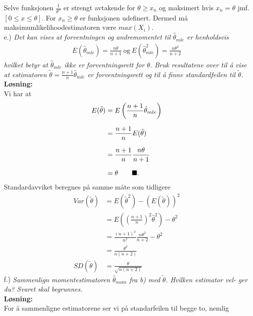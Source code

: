 \documentclass[12pt,
               a4paper,
               article,
               oneside,
               oldfontcommands,
               norsk]{memoir}
\newcommand{\Q}{ \qquad \hfill \blacksquare}
\begin{document}
Selve funksjonen $\frac{1}{\theta^n}$ er strengt avtakende for $\theta \geq x_n$ og maksimert hvis $x_n = \theta$ jmf. $[0 \leq x \leq \theta]$. For $x_n \geq \theta$ er funksjonen udefinert.
Dermed må maksimumlikelihoodestimatoren være $max(X_i)$.\vspace{4mm}\\
e.) \emph{Det kan vises at forventningen og andremomentet til $\hat{\theta}_{mle}$ er henholdsvis}
\begin{align*}
    E(\hat{\theta}_{mle}) = \frac{n\theta}{n+1} \ \text{og} \ E(\hat{\theta}_{mle}^2) = \frac{n\theta^2}{n+2}
\end{align*}
\emph{hvilket betyr at $\hat{\theta}_{mle}$ ikke er forventningsrett for $\theta$. Bruk resultatene over
til å vise at estimatoren $\tilde{\theta} = \frac{n+1}{n}\hat{\theta}_{mle}$ er forventningsrett og til å finne standardfeilen til $\tilde{\theta}$.}
\vspace{3mm}\\
\textbf{Løsning:}\vspace{3mm}\\
Vi har at 
\begin{align*}
    E(\tilde{\theta}) &= E \left(\frac{n+1}{n} \hat{\theta}_{mle} \right)\\[7pt]
    &= \frac{n+1}{n} E(\hat{\theta}) \\[7pt]
    &=  \frac{n+1}{n} \frac{n\theta}{n+1} \\[7pt]
    &= \theta \Q.
\end{align*}
Standardavviket beregnes på samme måte som tidligere 
\begin{align*}
    Var(\tilde{\theta}) &= E(\tilde{\theta}^2) - (E(\tilde{\theta}))^2 \\[7pt]
    &= E\left(\left(\frac{n + 1}{n}\right)^2 \hat{\theta}^2\right) - \theta^2 \\[7pt]
    &= \frac{(n+1)^2}{n^2} \frac{n\theta^2}{n+2} - \theta^2 \\[7pt]
    &= \frac{\theta^2}{n(n+2)} \\[7pt]
    SD(\tilde{\theta}) &= \frac{\theta}{\sqrt{n(n +2)}}
\end{align*}
f.) \emph{Sammenlign momentestimatoren $\hat{\theta}_{mom}$ fra b) med $\tilde{\theta}$. Hvilken estimator vel-
ger du? Svaret skal begrunnes.}
\vspace{3mm}\\
\textbf{Løsning:}\vspace{3mm}\\
For å sammenligne estimatorene ser vi på standarfeilen til begge to, nemlig 
\end{document}
